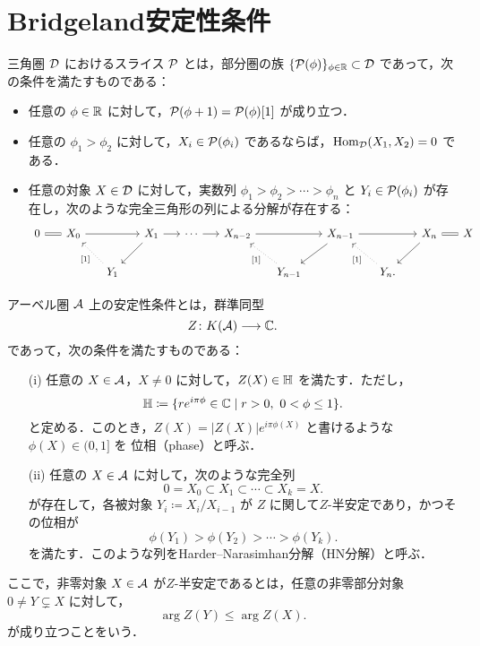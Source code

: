 \section{Bridgeland安定性条件}
\begin{defn}\cite{Bri07}
三角圏 $\D$ におけるスライス $\P$ とは，部分圏の族 $\{ \P(\phi) \}_{\phi \in \RR} \subset \D$ であって，次の条件を満たすものである：
\begin{itemize}
  \item 任意の $\phi \in \RR$ に対して，$\P(\phi + 1) = \P(\phi)[1]$ が成り立つ．
  \item 任意の $\phi_1 > \phi_2$ に対して，$X_i \in \P(\phi_i)$ であるならば，$\Hom_{\D}(X_1, X_2) = 0$ である．
  \item 任意の対象 $X \in \D$ に対して，実数列 $\phi_1 > \phi_2 > \cdots > \phi_n$ と $Y_i \in \P(\phi_i)$ が存在し，次のような完全三角形の列による分解が存在する：
  \[
    \begin{tikzcd}[column sep=1.5em]
      0 \ar[r, equal] & X_0 \ar[rr] && X_1 \ar[r] \ar[ld] & \cdots \ar[r] & X_{n-2} \ar[rr] && X_{n-1} \ar[ld] \ar[rr] && X_n \ar[ld] \ar[r, equal] & X \\
      && Y_1 \ar[lu, dotted,swap, "{[1]}"'] &&&& Y_{n-1} \ar[lu, dotted,swap, "{[1]}"'] && Y_n \ar[lu, dotted,swap, "{[1]}"'].
    \end{tikzcd}
  \]
\end{itemize}
\end{defn}


\begin{defn}\cite{Bri07}
アーベル圏 $\A$ 上の安定性条件とは，群準同型
\[
  Z \colon K(\A) \longrightarrow \CC.
\]
であって，次の条件を満たすものである：
\begin{itemize}
  \item[(i)] 任意の $X \in \A$，$X \neq 0$ に対して，$Z(X) \in \HH$ を満たす．ただし，
  \[
    \HH \coloneqq \{ re^{i\pi\phi} \in \CC \mid r > 0,\ 0 < \phi \le 1 \}.
  \]
  と定める．このとき，$Z(X) = |Z(X)|e^{i\pi\phi(X)}$ と書けるような $\phi(X) \in (0,1]$ を
  位相（phase）と呼ぶ．
  
  \item[(ii)] 任意の $X \in \A$ に対して，次のような完全列
  \[
    0 = X_0 \subset X_1 \subset \cdots \subset X_k = X.
  \]
  が存在して，各被対象 $Y_i \coloneqq X_i / X_{i-1}$ が $Z$ に関して$Z$-半安定であり，かつその位相が
  \[
    \phi(Y_1) > \phi(Y_2) > \cdots > \phi(Y_k).
  \]
  を満たす．このような列をHarder--Narasimhan分解（HN分解）と呼ぶ．
\end{itemize}

ここで，非零対象 $X \in \A$ が$Z$-半安定であるとは，任意の非零部分対象 $0 \neq Y \subsetneq X$ に対して，
\[
  \arg Z(Y) \le \arg Z(X).
\]
が成り立つことをいう．
\end{defn}


